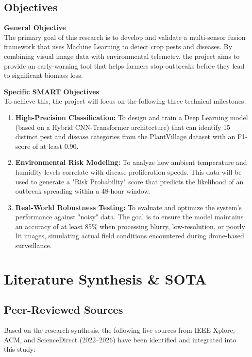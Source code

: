 \documentclass[12pt,a4paper]{article}
\begin{document}
\subsection{Objectives}

\textbf{General Objective} \\
The primary goal of this research is to develop and validate a multi-sensor fusion framework that uses Machine Learning to detect crop pests and diseases. By combining visual image data with environmental telemetry, the project aims to provide an early-warning tool that helps farmers stop outbreaks before they lead to significant biomass loss.

\textbf{Specific SMART Objectives} \\
To achieve this, the project will focus on the following three technical milestones:
\begin{enumerate}
    \item \textbf{High-Precision Classification:} To design and train a Deep Learning model (based on a Hybrid CNN-Transformer architecture) that can identify 15 distinct pest and disease categories from the PlantVillage dataset with an F1-score of at least 0.90.
    \item \textbf{Environmental Risk Modeling:} To analyze how ambient temperature and humidity levels correlate with disease proliferation speeds. This data will be used to generate a "Risk Probability" score that predicts the likelihood of an outbreak spreading within a 48-hour window.
    \item \textbf{Real-World Robustness Testing:} To evaluate and optimize the system's performance against "noisy" data. The goal is to ensure the model maintains an accuracy of at least 85\% when processing blurry, low-resolution, or poorly lit images, simulating actual field conditions encountered during drone-based surveillance.
\end{enumerate}


\section{Literature Synthesis \& SOTA}
\subsection{Peer-Reviewed Sources}

Based on the research synthesis, the following five sources from IEEE Xplore, ACM, and ScienceDirect (2022--2026) have been identified and integrated into this study:
\end{document}
